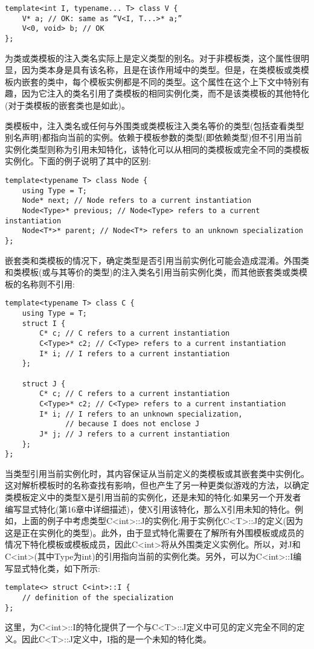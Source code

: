 \begin{lstlisting}[style=styleCXX]
template<int I, typename... T> class V {
	V* a; // OK: same as “V<I, T...>* a;”
	V<0, void> b; // OK
};
\end{lstlisting}


为类或类模板的注入类名实际上是定义类型的别名。对于非模板类，这个属性很明显，因为类本身是具有该名称，且是在该作用域中的类型。但是，在类模板或类模板内嵌套的类中，每个模板实例都是不同的类型。这个属性在这个上下文中特别有趣，因为它注入的类名引用了类模板的相同实例化类，而不是该类模板的其他特化(对于类模板的嵌套类也是如此)。

类模板中，注入类名或任何与外围类或类模板注入类名等价的类型(包括查看类型别名声明)都指向当前的实例。依赖于模板参数的类型(即依赖类型)但不引用当前实例化类型则称为引用未知特化，该特化可以从相同的类模板或完全不同的类模板实例化。下面的例子说明了其中的区别:

\begin{lstlisting}[style=styleCXX]
template<typename T> class Node {
	using Type = T;
	Node* next; // Node refers to a current instantiation
	Node<Type>* previous; // Node<Type> refers to a current instantiation
	Node<T*>* parent; // Node<T*> refers to an unknown specialization
};
\end{lstlisting}

嵌套类和类模板的情况下，确定类型是否引用当前实例化可能会造成混淆。外围类和类模板(或与其等价的类型)的注入类名引用当前实例化类，而其他嵌套类或类模板的名称则不引用:

\begin{lstlisting}[style=styleCXX]
template<typename T> class C {
	using Type = T;
	struct I {
		C* c; // C refers to a current instantiation
		C<Type>* c2; // C<Type> refers to a current instantiation
		I* i; // I refers to a current instantiation
	};

	struct J {
		C* c; // C refers to a current instantiation
		C<Type>* c2; // C<Type> refers to a current instantiation
		I* i; // I refers to an unknown specialization,
			  // because I does not enclose J
		J* j; // J refers to a current instantiation
	};
};
\end{lstlisting}

当类型引用当前实例化时，其内容保证从当前定义的类模板或其嵌套类中实例化。这对解析模板时的名称查找有影响，但也产生了另一种更类似游戏的方法，以确定类模板定义中的类型X是引用当前的实例化，还是未知的特化:如果另一个开发者编写显式特化(第16章中详细描述)，使X引用该特化，那么X引用未知的特化。例如，上面的例子中考虑类型C<int>::J的实例化:用于实例化C<T>::J的定义(因为这是正在实例化的类型)。此外，由于显式特化需要在了解所有外围模板或成员的情况下特化模板或模板成员，因此C<int>将从外围类定义实例化。所以，对J和C<int>(其中Type为int)的引用指向当前的实例化类。另外，可以为C<int>::I编写显式特化类，如下所示:

\begin{lstlisting}[style=styleCXX]
template<> struct C<int>::I {
	// definition of the specialization
};
\end{lstlisting}

这里，为C<int>::I的特化提供了一个与C<T>::J定义中可见的定义完全不同的定义。因此C<T>::J定义中，I指的是一个未知的特化类。


